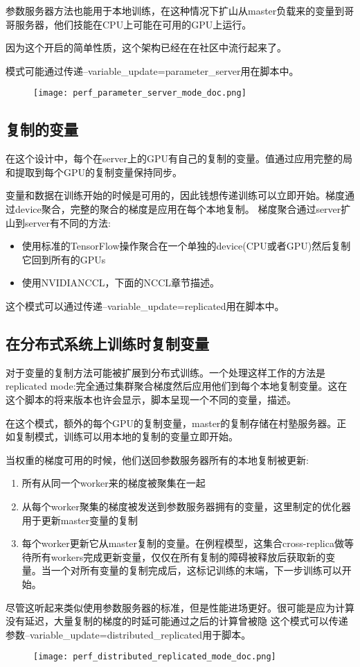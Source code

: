 参数服务器方法也能用于本地训练，在这种情况下扩山从master负载来的变量到哥哥服务器，他们技能在CPU上可能在可用的GPU上运行。

因为这个开启的简单性质，这个架构已经在在社区中流行起来了。

模式可能通过传递--variable\_update=parameter\_server用在脚本中。
\begin{figure}
	\centering
	\texttt{[image: perf\_parameter\_server\_mode\_doc.png]}
\end{figure}
\subsection{复制的变量}
在这个设计中，每个在server上的GPU有自己的复制的变量。值通过应用完整的局和提取到每个GPU的复制变量保持同步。

变量和数据在训练开始的时候是可用的，因此钱想传递训练可以立即开始。梯度通过device聚合，完整的聚合的梯度是应用在每个本地复制。
梯度聚合通过server扩山到server有不同的方法:
\begin{itemize}
	\item 使用标准的TensorFlow操作聚合在一个单独的device(CPU或者GPU)然后复制它回到所有的GPUs
	\item 使用NVIDIANCCL，下面的NCCL章节描述。
\end{itemize}
这个模式可以通过传递--variable\_update=replicated用在脚本中。
\subsection{在分布式系统上训练时复制变量}
对于变量的复制方法可能被扩展到分布式训练。一个处理这样工作的方法是replicated mode:完全通过集群聚合梯度然后应用他们到每个本地复制变量。这在这个脚本的将来版本也许会显示，脚本呈现一个不同的变量，描述。

在这个模式，额外的每个GPU的复制变量，master的复制存储在村塾服务器。正如复制模式，训练可以用本地的复制的变量立即开始。

当权重的梯度可用的时候，他们送回参数服务器所有的本地复制被更新:
\begin{enumerate}
	\item 所有从同一个worker来的梯度被聚集在一起
	\item 从每个worker聚集的梯度被发送到参数服务器拥有的变量，这里制定的优化器用于更新master变量的复制
	\item 每个worker更新它从master复制的变量。在例程模型，这集合cross-replica做等待所有workers完成更新变量，仅仅在所有复制的障碍被释放后获取新的变量。当一个对所有变量的复制完成后，这标记训练的末端，下一步训练可以开始。
\end{enumerate}
尽管这听起来类似使用参数服务器的标准，但是性能进场更好。很可能是应为计算没有延迟，大量复制的梯度的时延可能通过之后的计算曾被隐
这个模式可以传递参数--variable\_update=distributed\_replicated用于脚本。
\begin{figure}[H]
	\centering
	\texttt{[image: perf\_distributed\_replicated\_mode\_doc.png]}
\end{figure}
